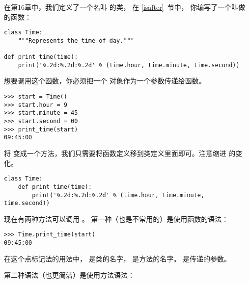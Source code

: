 在第16章中，我们定义了一个名叫  的类， 在 \ref{isafter}~节中， 
你编写了一个叫做  的函数：

\begin{lstlisting}
class Time:
    """Represents the time of day."""

def print_time(time):
    print('%.2d:%.2d:%.2d' % (time.hour, time.minute, time.second))
\end{lstlisting}


想要调用这个函数，你必须把一个  对象作为一个参数传递给函数。

\begin{lstlisting}
>>> start = Time()
>>> start.hour = 9
>>> start.minute = 45
>>> start.second = 00
>>> print_time(start)
09:45:00
\end{lstlisting}


将  变成一个方法，我们只需要将函数定义移到类定义里面即可。注意缩进
的变化。
  

\begin{lstlisting}
class Time:
    def print_time(time):
        print('%.2d:%.2d:%.2d' % (time.hour, time.minute, time.second))
\end{lstlisting}


现在有两种方法可以调用 。 第一种（也是不常用的）是使用函数的语法：
  

\begin{lstlisting}
>>> Time.print_time(start)
09:45:00
\end{lstlisting}


在这个点标记法的用法中，  是类的名字， 是方法的名字。  
 是传递的参数。

第二种语法（也更简洁）是使用方法语法：

